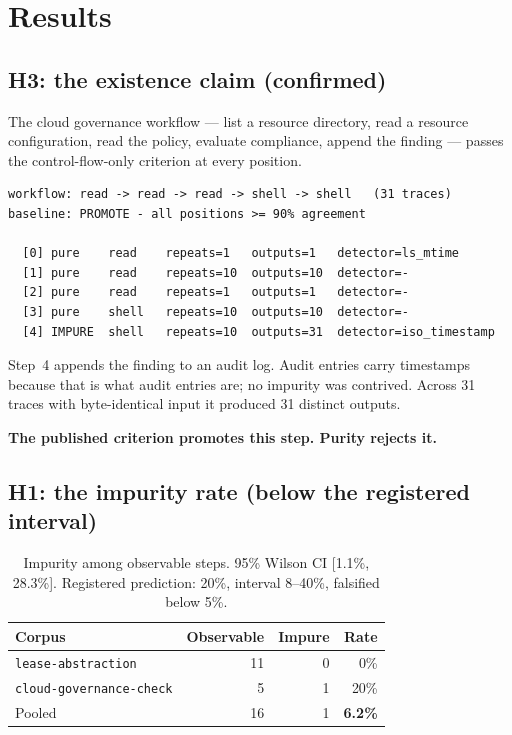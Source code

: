 \documentclass[10pt,conference]{article}
\begin{document}
\section{Results}
\label{sec:results}

\subsection{H3: the existence claim (confirmed)}

The cloud governance workflow --- list a resource directory, read a resource
configuration, read the policy, evaluate compliance, append the finding ---
passes the control-flow-only criterion at every position.

\begin{lstlisting}
workflow: read -> read -> read -> shell -> shell   (31 traces)
baseline: PROMOTE - all positions >= 90% agreement

  [0] pure    read    repeats=1   outputs=1   detector=ls_mtime
  [1] pure    read    repeats=10  outputs=10  detector=-
  [2] pure    read    repeats=1   outputs=1   detector=-
  [3] pure    shell   repeats=10  outputs=10  detector=-
  [4] IMPURE  shell   repeats=10  outputs=31  detector=iso_timestamp
\end{lstlisting}

Step~4 appends the finding to an audit log. Audit entries carry timestamps
because that is what audit entries are; no impurity was contrived. Across 31
traces with byte-identical input it produced 31 distinct outputs.

\textbf{The published criterion promotes this step. Purity rejects it.}

\subsection{H1: the impurity rate (below the registered interval)}

\begin{table}[h]
\centering
\begin{tabular}{lrrr}
\toprule
Corpus & Observable & Impure & Rate \\
\midrule
\texttt{lease-abstraction} & 11 & 0 & 0\% \\
\texttt{cloud-governance-check} & 5 & 1 & 20\% \\
\midrule
Pooled & 16 & 1 & \textbf{6.2\%} \\
\bottomrule
\end{tabular}
\caption{Impurity among observable steps. 95\% Wilson CI [1.1\%, 28.3\%].
Registered prediction: 20\%, interval 8--40\%, falsified below 5\%.}
\end{table}
\end{document}
